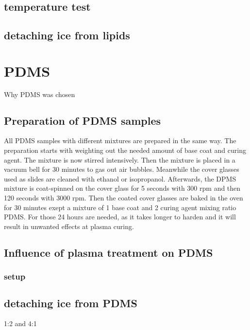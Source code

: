 \subsection{temperature test}

\subsection{detaching ice from lipids}

\section{PDMS}

Why PDMS was chosen

\subsection{Preparation of PDMS samples}

All PDMS samples with different mixtures are prepared in the same way. The preparation starts with weighting out the needed amount of base coat and curing agent. The mixture is now stirred intensively. Then the mixture is placed in a vacuum bell for 30 minutes to gas out air bubbles. Meanwhile the cover glasses used as slides are cleaned with ethanol or isopropanol. Afterwards, the DPMS mixture is coat-spinned on the cover glass for 5 seconds with 300 rpm and then 120 seconds with 3000 rpm. Then the coated cover glasses are baked in the oven for 30 minutes exept a mixture of 1 base coat and 2 curing agent mixing ratio PDMS. For those 24 hours are needed, as it takes longer to harden and it will result in unwanted effects at plasma curing.

\subsection{Influence of plasma treatment on PDMS}

\subsubsection{setup}

\subsection{detaching ice from PDMS}

1:2 and 4:1

